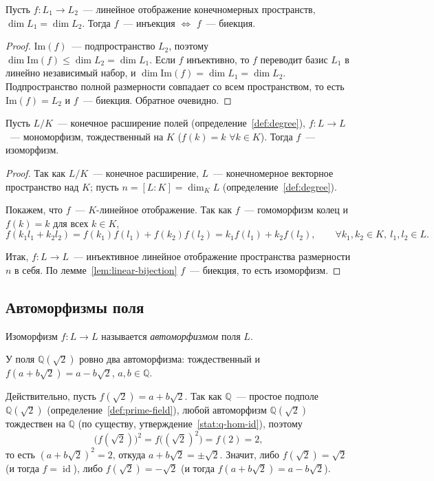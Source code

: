 \documentclass[12pt]{article}
\newcommand{\Img}[1]{\text{Im}(#1)}
\begin{document}
	\begin{lemma}\label{lem:linear-bijection}
		Пусть $f: L_1 \to L_2$~--- линейное отображение конечномерных пространств, $\dim L_1 = \dim L_2$. Тогда $f$~--- инъекция $\Leftrightarrow$ $f$~--- биекция.
	\end{lemma}
	\begin{proof}
		$\Img{f}$~--- подпространство $L_2$, поэтому $\dim \Img{f} \leqslant \dim L_2 = \dim L_1$. Если $f$ инъективно, то $f$ переводит базис $L_1$ в линейно независимый набор, и $\dim \Img{f} = \dim L_1 = \dim L_2$. Подпространство полной размерности совпадает со всем пространством, то есть $\Img{f} = L_2$ и $f$~--- биекция. Обратное очевидно.
	\end{proof}

	\begin{theorem}\label{thm:endo-iso}
		Пусть $L/K$~--- конечное расширение полей (определение~\ref{def:degree}), $f: L \to L$~--- мономорфизм, тождественный на $K$ ($f(k)=k$ $\forall k \in K$). Тогда $f$~--- изоморфизм.
	\end{theorem}
	\begin{proof}
		Так как $L/K$~--- конечное расширение, $L$~--- конечномерное векторное пространство над $K$; пусть $n = [L:K] = \dim_K L$ (определение~\ref{def:degree}).

		Покажем, что $f$~--- $K$-линейное отображение. Так как $f$~--- гомоморфизм колец и $f(k)=k$ для всех $k \in K$,
		\[
			f(k_1 l_1 + k_2 l_2) = f(k_1)f(l_1) + f(k_2)f(l_2) = k_1 f(l_1) + k_2 f(l_2), \qquad \forall k_1, k_2 \in K,\ l_1, l_2 \in L.
		\]

		Итак, $f: L \to L$~--- инъективное линейное отображение пространства размерности $n$ в себя. По лемме~\ref{lem:linear-bijection} $f$~--- биекция, то есть изоморфизм.
	\end{proof}

	\subsection{Автоморфизмы поля}

	\begin{definition}[Автоморфизм]\label{def:automorphism}
		Изоморфизм $f: L \to L$ называется \emph{автоморфизмом} поля $L$.
	\end{definition}

	\begin{example}
		У поля $\mathbb{Q}(\sqrt{2})$ ровно два автоморфизма: тождественный и $f(a+b\sqrt{2}) = a - b\sqrt{2}$, $a, b \in \mathbb{Q}$.

		Действительно, пусть $f(\sqrt2) = a+b\sqrt2$. Так как $\mathbb{Q}$~--- простое подполе $\mathbb{Q}(\sqrt2)$ (определение~\ref{def:prime-field}), любой автоморфизм $\mathbb{Q}(\sqrt2)$ тождествен на $\mathbb{Q}$ (по существу, утверждение~\ref{stat:q-hom-id}), поэтому
		\[
			\bigl(f(\sqrt2)\bigr)^2 = f\bigl((\sqrt2)^2\bigr) = f(2) = 2,
		\]
		то есть $(a+b\sqrt2)^2 = 2$, откуда $a+b\sqrt2 = \pm\sqrt2$. Значит, либо $f(\sqrt2)=\sqrt2$ (и тогда $f = \operatorname{id}$), либо $f(\sqrt2)=-\sqrt2$ (и тогда $f(a+b\sqrt2) = a-b\sqrt2$).
	\end{example}
\end{document}
